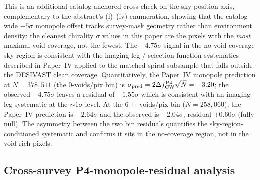\documentclass[aps,prd,twocolumn,superscriptaddress,showpacs,preprintnumbers,nofootinbib,longbibliography,floatfix]{revtex4-2}
\begin{document}
This is an additional catalog-anchored cross-check on the sky-position axis, complementary to the abstract's (i)--(iv) enumeration, showing that the catalog-wide
$-5\sigma$ monopole offset tracks survey-mask geometry rather than environment
density: the cleanest chirality $\sigma$ values in this paper are the
pixels with the \emph{most} maximal-void coverage, not the fewest. The
$-4.75\sigma$ signal in the no-void-coverage sky region is consistent
with the imaging-leg / selection-function systematics described in
Paper~IV applied to the matched-spiral subsample that falls outside
the DESIVAST clean coverage. Quantitatively, the Paper~IV monopole
prediction at $N = 378{,}511$ (the 0-voids/pix bin) is
$\sigma_{\rm pred} = 2\Delta f_{\rm CW}^{\rm P4}\sqrt{N} = -3.20$;
the observed $-4.75\sigma$ leaves a residual of $-1.55\sigma$ which
is consistent with an imaging-leg systematic at the
$\sim\!1\sigma$ level. At the $6+$ voids/pix bin
($N = 258{,}060$), the Paper~IV prediction is $-2.64\sigma$ and the
observed is $-2.04\sigma$, residual $+0.60\sigma$ (fully null).
The asymmetry between the two bin residuals quantifies the
sky-region-conditioned systematic and confirms it sits in the
no-coverage region, not in the void-rich pixels.

\subsection{Cross-survey P4-monopole-residual analysis}\label{sec:desivast_p4_residual}
\end{document}
